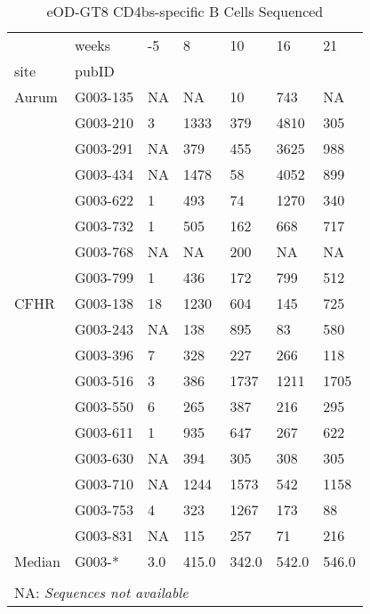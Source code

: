 \documentclass{article}
\begin{document}
    \begin{table}
\centering
\caption{eOD-GT8 CD4bs-specific B Cells Sequenced}
\begin{tabular}{lllllll}
\toprule
       & weeks &   -5 &      8 &     10 &     16 &     21 \\
site & pubID &      &        &        &        &        \\
\midrule
Aurum & G003-135 &  NA &  NA &  10 &  743 &  NA \\
       & G003-210 &  3 &  1333 &  379 &  4810 &  305 \\
       & G003-291 &  NA &  379 &  455 &  3625 &  988 \\
       & G003-434 &  NA &  1478 &  58 &  4052 &  899 \\
       & G003-622 &  1 &  493 &  74 &  1270 &  340 \\
       & G003-732 &  1 &  505 &  162 &  668 &  717 \\
       & G003-768 &  NA &  NA &  200 &  NA &  NA \\
       & G003-799 &  1 &  436 &  172 &  799 &  512 \\
\midrule
CFHR & G003-138 &  18 &  1230 &  604 &  145 &  725 \\
       & G003-243 &  NA &  138 &  895 &  83 &  580 \\
       & G003-396 &  7 &  328 &  227 &  266 &  118 \\
       & G003-516 &  3 &  386 &  1737 &  1211 &  1705 \\
       & G003-550 &  6 &  265 &  387 &  216 &  295 \\
       & G003-611 &  1 &  935 &  647 &  267 &  622 \\
       & G003-630 &  NA &  394 &  305 &  308 &  305 \\
       & G003-710 &  NA &  1244 &  1573 &  542 &  1158 \\
       & G003-753 &  4 &  323 &  1267 &  173 &  88 \\
       & G003-831 &  NA &  115 &  257 &  71 &  216 \\
\midrule
Median & G003-* &  3.0 &  415.0 &  342.0 &  542.0 &  546.0 \\
\bottomrule
\multicolumn{7}{l}{} \\
\multicolumn{7}{l}{NA: \textit{Sequences not available}} \\
\end{tabular}
\end{table}
\end{document}
